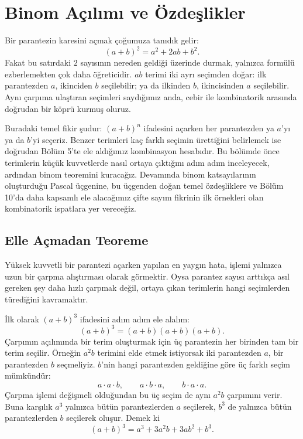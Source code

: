 \chapter[Binom Açılımı ve Özdeşlikler · \textit{Orta}]{Binom Açılımı ve Özdeşlikler}

Bir parantezin karesini açmak çoğumuza tanıdık gelir:
\[
(a+b)^2=a^2+2ab+b^2.
\]
Fakat bu satırdaki $2$ sayısının nereden geldiği üzerinde durmak, yalnızca formülü ezberlemekten çok daha öğreticidir. $ab$ terimi iki ayrı seçimden doğar: ilk parantezden $a$, ikinciden $b$ seçilebilir; ya da ilkinden $b$, ikincisinden $a$ seçilebilir. Aynı çarpıma ulaştıran seçimleri saydığımız anda, cebir ile kombinatorik arasında doğrudan bir köprü kurmuş oluruz.

Buradaki temel fikir şudur: $(a+b)^n$ ifadesini açarken her parantezden ya $a$'yı ya da $b$'yi seçeriz. Benzer terimleri kaç farklı seçimin ürettiğini belirlemek ise doğrudan Bölüm 5'te ele aldığımız kombinasyon hesabıdır. Bu bölümde önce terimlerin küçük kuvvetlerde nasıl ortaya çıktığını adım adım inceleyecek, ardından binom teoremini kuracağız. Devamında binom katsayılarının oluşturduğu Pascal üçgenine, bu üçgenden doğan temel özdeşliklere ve Bölüm 10'da daha kapsamlı ele alacağımız çifte sayım fikrinin ilk örnekleri olan kombinatorik ispatlara yer vereceğiz.

\section{Elle Açmadan Teoreme}

Yüksek kuvvetli bir parantezi açarken yapılan en yaygın hata, işlemi yalnızca uzun bir çarpma alıştırması olarak görmektir. Oysa parantez sayısı arttıkça asıl gereken şey daha hızlı çarpmak değil, ortaya çıkan terimlerin hangi seçimlerden türediğini kavramaktır.

İlk olarak $(a+b)^3$ ifadesini adım adım ele alalım:
\[
(a+b)^3=(a+b)(a+b)(a+b).
\]
Çarpımın açılımında bir terim oluşturmak için üç parantezin her birinden tam bir terim seçilir. Örneğin $a^2b$ terimini elde etmek istiyorsak iki parantezden $a$, bir parantezden $b$ seçmeliyiz. $b$'nin hangi parantezden geldiğine göre üç farklı seçim mümkündür:
\[
a\cdot a\cdot b,\qquad a\cdot b\cdot a,\qquad b\cdot a\cdot a.
\]
Çarpma işlemi değişmeli olduğundan bu üç seçim de aynı $a^2b$ çarpımını verir. Buna karşılık $a^3$ yalnızca bütün parantezlerden $a$ seçilerek, $b^3$ de yalnızca bütün parantezlerden $b$ seçilerek oluşur. Demek ki
\[
(a+b)^3=a^3+3a^2b+3ab^2+b^3.
\]

